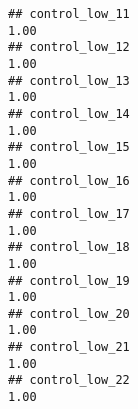 \documentclass[
]{article}
\begin{document}
\begin{verbatim}
## control_low_11                                                                                                                                                                                                                 1.00
## control_low_12                                                                                                                                                                                                                 1.00
## control_low_13                                                                                                                                                                                                                 1.00
## control_low_14                                                                                                                                                                                                                 1.00
## control_low_15                                                                                                                                                                                                                 1.00
## control_low_16                                                                                                                                                                                                                 1.00
## control_low_17                                                                                                                                                                                                                 1.00
## control_low_18                                                                                                                                                                                                                 1.00
## control_low_19                                                                                                                                                                                                                 1.00
## control_low_20                                                                                                                                                                                                                 1.00
## control_low_21                                                                                                                                                                                                                 1.00
## control_low_22                                                                                                                                                                                                                 1.00

\end{verbatim}
\end{document}
